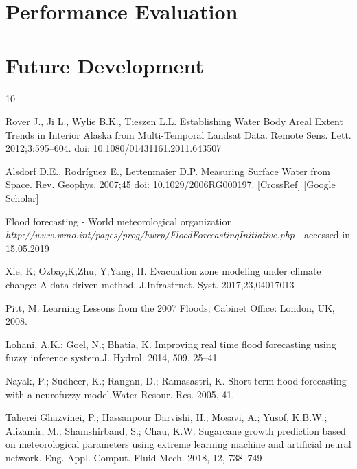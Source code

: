 \documentclass[12pt, a4paper]{report}
\begin{document}
\section{Performance Evaluation} 


\section{Future Development}


\renewcommand{\bibname}{Bibliography}


\begin{thebibliography} {10}

 Rover J., Ji L., Wylie B.K., Tieszen L.L. Establishing Water Body Areal Extent Trends in Interior Alaska from Multi-Temporal Landsat Data. Remote Sens. Lett. 2012;3:595–604. doi: 10.1080/01431161.2011.643507

 Alsdorf D.E., Rodríguez E., Lettenmaier D.P. Measuring Surface Water from Space. Rev. Geophys. 2007;45 doi: 10.1029/2006RG000197. [CrossRef] [Google Scholar]

Flood forecasting - World meteorological organization \textit{http://www.wmo.int/pages/prog/hwrp/FloodForecastingInitiative.php} - accessed in 15.05.2019


 Xie, K; Ozbay,K;Zhu, Y;Yang, H. Evacuation zone modeling under climate change: A data-driven method. J.Infrastruct. Syst. 2017,23,04017013

Pitt, M.	Learning Lessons from the 2007 Floods; Cabinet Office: London, UK, 2008.

Lohani, A.K.; Goel, N.; Bhatia, K. Improving real time flood forecasting using fuzzy inference system.J. Hydrol. 2014, 509, 25–41

Nayak, P.; Sudheer, K.; Rangan, D.; Ramasastri, K. Short-term flood forecasting with a neurofuzzy model.Water Resour. Res. 2005, 41.

Taherei Ghazvinei, P.; Hassanpour Darvishi, H.; Mosavi, A.; Yusof, K.B.W.; Alizamir, M.; Shamshirband, S.; Chau, K.W. Sugarcane growth prediction based on meteorological parameters using extreme learning machine and artificial neural network. Eng. Appl. Comput. Fluid Mech. 2018, 12, 738–749


\end{thebibliography}
\end{document}
